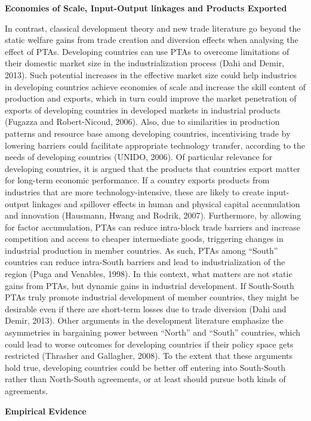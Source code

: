 \documentclass[12pt]{article}%
\begin{document}
\textbf{Economies of Scale, Input-Output linkages and Products Exported}

In contrast, classical development theory and new trade literature go
beyond the static welfare gains from trade creation and diversion
effects when analysing the effect of PTAs. Developing countries can use
PTAs to overcome limitations of their domestic market size in the
industrialization process (Dahi and Demir, 2013). Such potential
increases in the effective market size could help industries in
developing countries achieve economies of scale and increase the skill
content of production and exports, which in turn could improve the
market penetration of exports of developing countries in developed
markets in industrial products (Fugazza and Robert-Nicoud, 2006). Also,
due to similarities in production patterns and resource base among
developing countries, incentivising trade by lowering barriers could
facilitate appropriate technology transfer, according to the needs of
developing countries (UNIDO, 2006). Of particular relevance for
developing countries, it is argued that the products that countries
export matter for long-term economic performance. If a country exports
products from industries that are more technology-intensive, these are
likely to create input-output linkages and spillover effects in human
and physical capital accumulation and innovation (Hausmann, Hwang and
Rodrik, 2007). Furthermore, by allowing for factor accumulation, PTAs
can reduce intra-block trade barriers and increase competition and
access to cheaper intermediate goods, triggering changes in industrial
production in member countries. As such, PTAs among ``South'' countries
can reduce intra-South barriers and lead to industrialization of the
region (Puga and Venables, 1998). In this context, what matters are not
static gains from PTAs, but dynamic gains in industrial development. If
South-South PTAs truly promote industrial development of member
countries, they might be desirable even if there are short-term losses
due to trade diversion (Dahi and Demir, 2013). Other arguments in the
development literature emphasize the asymmetries in bargaining power
between ``North'' and ``South'' countries, which could lead to worse
outcomes for developing countries if their policy space gets restricted
(Thrasher and Gallagher, 2008). To the extent that these arguments hold
true, developing countries could be better off entering into South-South
rather than North-South agreements, or at least should pursue both kinds
of agreements.

\textbf{Empirical Evidence}
\end{document}
